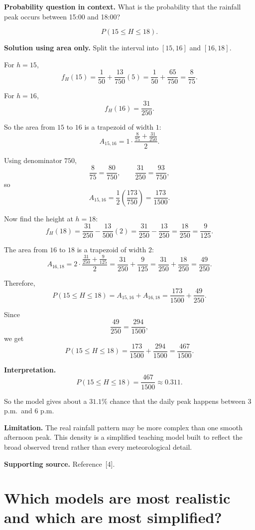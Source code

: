 \documentclass[11pt]{article}
\begin{document}
	\textbf{Probability question in context.} What is the probability that the rainfall peak occurs between 15:00 and 18:00?
	
	\[
	P(15\le H\le 18).
	\]
	
	\textbf{Solution using area only.} Split the interval into $[15,16]$ and $[16,18]$.
	
	For $h=15$,
	\[
	f_H(15)=\frac{1}{50}+\frac{13}{750}(5)
	=\frac{1}{50}+\frac{65}{750}
	=\frac{8}{75}.
	\]
	
	For $h=16$,
	\[
	f_H(16)=\frac{31}{250}.
	\]
	
	So the area from $15$ to $16$ is a trapezoid of width $1$:
	\[
	A_{15,16}=1\cdot \frac{\frac{8}{75}+\frac{31}{250}}{2}.
	\]
	
	Using denominator $750$,
	\[
	\frac{8}{75}=\frac{80}{750},\qquad
	\frac{31}{250}=\frac{93}{750},
	\]
	so
	\[
	A_{15,16}=\frac12\left(\frac{173}{750}\right)=\frac{173}{1500}.
	\]
	
	Now find the height at $h=18$:
	\[
	f_H(18)=\frac{31}{250}-\frac{13}{500}(2)
	=\frac{31}{250}-\frac{13}{250}
	=\frac{18}{250}
	=\frac{9}{125}.
	\]
	
	The area from $16$ to $18$ is a trapezoid of width $2$:
	\[
	A_{16,18}=2\cdot \frac{\frac{31}{250}+\frac{9}{125}}{2}
	=\frac{31}{250}+\frac{9}{125}
	=\frac{31}{250}+\frac{18}{250}
	=\frac{49}{250}.
	\]
	
	Therefore,
	\[
	P(15\le H\le 18)=A_{15,16}+A_{16,18}
	=\frac{173}{1500}+\frac{49}{250}.
	\]
	
	Since
	\[
	\frac{49}{250}=\frac{294}{1500},
	\]
	we get
	\[
	P(15\le H\le 18)=\frac{173}{1500}+\frac{294}{1500}
	=\frac{467}{1500}.
	\]
	
	\textbf{Interpretation.}
	\[
	P(15\le H\le 18)=\frac{467}{1500}\approx 0.311.
	\]
	
	So the model gives about a $31.1\%$ chance that the daily peak happens between 3 p.m.\ and 6 p.m.
	
	\textbf{Limitation.} The real rainfall pattern may be more complex than one smooth afternoon peak. This density is a simplified teaching model built to reflect the broad observed trend rather than every meteorological detail.
	
	\textbf{Supporting source.} Reference \,[4].
	
	\section{Which models are most realistic and which are most simplified?}
	
\end{document}
